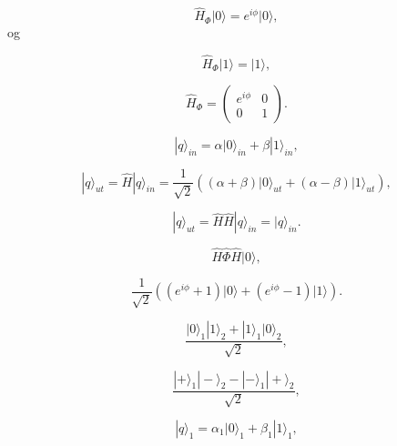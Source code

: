 \documentclass[%
oneside,                 %
final,                   %
10pt]{article}
\begin{document}
\begin{equation}
   \hat{H}_{\Phi}\vert 0 \rangle=e^{i\phi}\vert 0 \rangle,
\end{equation}
og

\begin{equation}
   \hat{H}_{\Phi}|1\rangle=|1\rangle,
\end{equation}

\begin{equation}
   \hat{H}_{\Phi}=   
   \left(\begin{array}{cc} e^{i\phi} & 0 \\ 0& 1\end{array}   \right).
\end{equation}

\begin{equation}
    |q\rangle_{in} = \alpha \vert 0 \rangle_{in} + \beta |1\rangle_{in},
\end{equation}

\begin{equation}
    |q\rangle_{ut}=\hat{H}|q\rangle_{in} = 
    \frac{1}{\sqrt{2}}((\alpha+\beta)\vert 0 \rangle_{ut} + 
    (\alpha-\beta)|1\rangle_{ut}),
\end{equation}

\begin{equation} 
   |q\rangle_{ut}=\hat{H}\hat{H}|q\rangle_{in}=|q\rangle_{in}.
\end{equation}

\begin{equation} 
   \hat{H}\hat{\Phi}\hat{H}\vert 0 \rangle,
\end{equation}

\begin{equation}
    \frac{1}{\sqrt{2}}((e^{i\phi}+1)\vert 0 \rangle + 
    (e^{i\phi}-1)|1\rangle).
\end{equation}

\begin{equation}
   \frac{\vert 0 \rangle_1 |1\rangle_2 + |1\rangle_1\vert 0 \rangle_2}{\sqrt{2}},
   \label{eq:superent}
\end{equation}

\begin{equation}
   \frac{|+\rangle_1 |-\rangle_2 - |-\rangle_1|+\rangle_2}{\sqrt{2}},
   \label{eq:superent1}
\end{equation}

\begin{equation}
    |q\rangle_{1} = \alpha_1 \vert 0 \rangle_{1} + \beta_1 |1\rangle_{1},
\end{equation}
\end{document}
